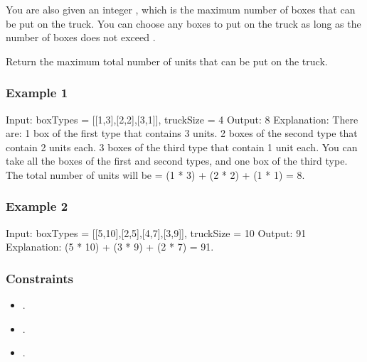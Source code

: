 \documentclass[letterpaper,12pt,english]{book}
\begin{document}
\sphinxAtStartPar
You are also given an integer , which is the maximum number of boxes that can be put on the truck. You can choose any boxes to put on the truck as long as the number of boxes does not exceed .

\sphinxAtStartPar
Return the maximum total number of units that can be put on the truck.


\subsubsection{Example 1}
\label{\detokenize{Mathematics/09_MTH_1710_Maximum_Units_on_a_Truck:example-1}}
\begin{sphinxVerbatim}[commandchars=\\\{\}]
Input: boxTypes = [[1,3],[2,2],[3,1]], truckSize = 4
Output: 8
Explanation: There are:
\PYGZhy{} 1 box of the first type that contains 3 units.
\PYGZhy{} 2 boxes of the second type that contain 2 units each.
\PYGZhy{} 3 boxes of the third type that contain 1 unit each.
You can take all the boxes of the first and second types, and one box of the third type.
The total number of units will be = (1 * 3) + (2 * 2) + (1 * 1) = 8.
\end{sphinxVerbatim}


\subsubsection{Example 2}
\label{\detokenize{Mathematics/09_MTH_1710_Maximum_Units_on_a_Truck:example-2}}
\begin{sphinxVerbatim}[commandchars=\\\{\}]
Input: boxTypes = [[5,10],[2,5],[4,7],[3,9]], truckSize = 10
Output: 91
Explanation: (5 * 10) + (3 * 9) + (2 * 7) = 91.
\end{sphinxVerbatim}


\subsubsection{Constraints}
\label{\detokenize{Mathematics/09_MTH_1710_Maximum_Units_on_a_Truck:constraints}}\begin{itemize}
\item {} 
\sphinxAtStartPar
{}.

\item {} 
\sphinxAtStartPar
{}.

\item {} 
\sphinxAtStartPar
{}.

\end{itemize}
\end{document}
